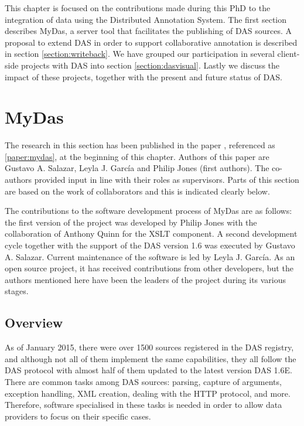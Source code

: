 This chapter is focused on the contributions made during this PhD to the integration of data using the Distributed Annotation System. The first section describes  MyDas, a server tool that facilitates the publishing of DAS sources. A proposal to extend DAS in order to support collaborative annotation is described in section \ref{section:writeback}. We have grouped our participation in several client-side projects with DAS into section \ref{section:dasvisual}. Lastly we discuss the impact of these projects, together with the present and future status of DAS. 

\section{MyDas} \label{section:mydas}

The research in this section has been published in the paper \cite{SAL2012}, referenced as \ref{paper:mydas}, at the beginning of this chapter. Authors of this paper are Gustavo A. Salazar, Leyla J. García and Philip Jones (first authors). The co-authors provided input in line with their roles as supervisors.  Parts of this section are based on the work of collaborators and this is indicated clearly below. 

The contributions to the software development process of MyDas are as follows: the first version of the project was developed by Philip Jones with the collaboration of Anthony Quinn for the XSLT component. A second development cycle together with the support of the DAS version 1.6 was executed by Gustavo A. Salazar. Current maintenance of the software is led by Leyla J. García. As an open source project, it has received contributions from other developers, but the authors mentioned here have been the leaders of the project during its various stages.

\subsection{Overview}

As of January 2015, there were over 1500 sources registered in the DAS registry, and although not all of them implement the same capabilities, they all follow the DAS protocol with almost half of them updated to the latest version DAS 1.6E. There are common tasks among DAS sources:  parsing, capture of arguments, exception handling, XML creation, dealing with the HTTP protocol, and more. Therefore, software specialised in these tasks is needed in order to allow data providers to focus on their specific cases.


